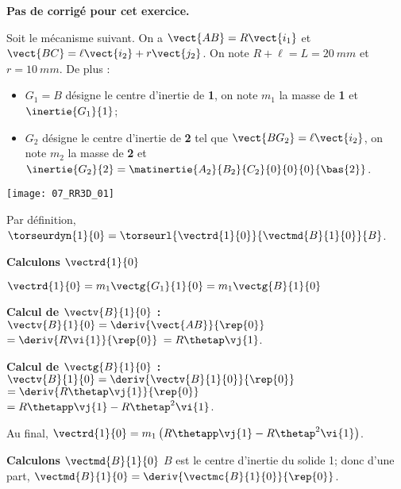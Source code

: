 \normalfalse \difficiletrue \tdifficilefalse
\correctionfalse


\setcounter{numques}{0}
\ifcorrection
\else
\textbf{Pas de corrigé pour cet exercice.}
\fi

\ifprof
\else
Soit le mécanisme suivant. On a $\vect{AB}=R\vect{i_1}$ et $\vect{BC}=\ell\vect{i_2}+r\vect{j_2}$. On note $R+\ell=L = \SI{20}{mm}$ et $r=\SI{10}{mm}$. De plus :
\begin{itemize}
\item $G_1=B$ désigne le centre d'inertie de \textbf{1}, on note $m_1$ la masse de \textbf{1} et $\inertie{G_1}{1}$; 
\item $G_2$ désigne le centre d'inertie de \textbf{2} tel que  $\vect{BG_2}=\ell\vect{i_2}$, on note $m_2$ la masse de \textbf{2} et $\inertie{G_2}{2}=\matinertie{A_2}{B_2}{C_2}{0}{0}{0}{\bas{2}}$.
\end{itemize}
\begin{center}
\texttt{[image: 07\_RR3D\_01]}
\end{center}
\fi

\ifprof

Par définition, $\torseurdyn{1}{0} = \torseurl{\vectrd{1}{0}}{\vectmd{B}{1}{0}}{B}$.

\textbf{Calculons $\vectrd{1}{0}$}

$\vectrd{1}{0} = m_1\vectg{G_1}{1}{0}=m_1 \vectg{B}{1}{0} $

 \textbf{Calcul de $\vectv{B}{1}{0}$ : }  
$\vectv{B}{1}{0}=\deriv{\vect{AB}}{\rep{0}}$ 
$=\deriv{ R\vi{1}}{\rep{0}}$  
$= R\thetap \vj{1}$.


 \textbf{Calcul de $\vectg{B}{1}{0}$ : }  
$\vectv{B}{1}{0}=\deriv{\vectv{B}{1}{0}}{\rep{0}}$ 
$=\deriv{ R\thetap \vj{1}}{\rep{0}}$  
$=  R\thetapp \vj{1}-R\thetap^2 \vi{1}$.

Au final, $\vectrd{1}{0}= m_1\left(R\thetapp \vj{1}-R\thetap^2 \vi{1}\right)$.
\vspace{.5cm}

\textbf{Calculons $\vectmd{B}{1}{0}$}
$B$ est le centre d'inertie du solide 1; donc 
 d'une part, $\vectmd{B}{1}{0} = \deriv{\vectmc{B}{1}{0} }{\rep{0}}$.
 
